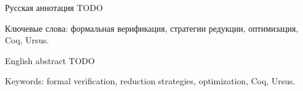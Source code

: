 \documentclass[../diploma.tex]{subfiles}
\begin{document}
Русская аннотация TODO

\vspace*{\fill}

Ключевые слова: формальная верификация, стратегии редукции, оптимизация, Coq, Ursus.

\newpage

English abstract TODO
\vspace*{\fill}

Keywords: formal verification, reduction strategies, optimization, Coq, Ursus.
\end{document}
